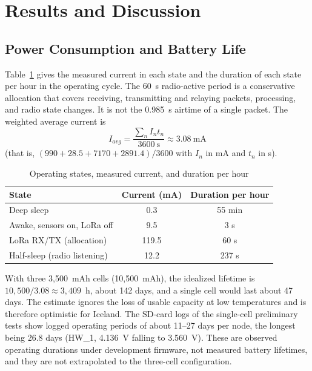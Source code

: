 \section{Results and Discussion}
\subsection{Power Consumption and Battery Life}
Table~\ref{tab:power} gives the measured current in each state and the duration of each state per hour in the operating cycle. The 60~s radio-active period is a conservative allocation that covers receiving, transmitting and relaying packets, processing, and radio state changes. It is not the 0.985~s airtime of a single packet. The weighted average current is
\begin{equation}
I_{avg}=\frac{\sum_n I_n t_n}{3600~\text{s}}\approx 3.08~\text{mA}
\label{eq:iavg}
\end{equation}
(that is, $(990+28.5+7170+2891.4)/3600$ with $I_n$ in mA and $t_n$ in s).

\begin{table}[!t]
\renewcommand{\arraystretch}{1.1}
\caption{Operating states, measured current, and duration per hour}
\label{tab:power}
\centering
\footnotesize
\setlength{\tabcolsep}{4pt}
\begin{tabular}{>{\raggedright\arraybackslash}p{}cc}
\toprule
State & Current (mA) & Duration per hour \\
\midrule
Deep sleep & 0.3 & 55 min \\
Awake, sensors on, LoRa off & 9.5 & 3 s \\
LoRa RX/TX (allocation) & 119.5 & 60 s \\
Half-sleep (radio listening) & 12.2 & 237 s \\
\bottomrule
\end{tabular}
\end{table}

With three 3,500~mAh cells (10,500~mAh), the idealized lifetime is $10{,}500/3.08\approx 3{,}409$~h, about 142 days, and a single cell would last about 47 days. The estimate ignores the loss of usable capacity at low temperatures and is therefore optimistic for Iceland. The SD-card logs of the single-cell preliminary tests show logged operating periods of about 11--27 days per node, the longest being 26.8 days (HW\_1, 4.136~V falling to 3.560~V). These are observed operating durations under development firmware, not measured battery lifetimes, and they are not extrapolated to the three-cell configuration.

